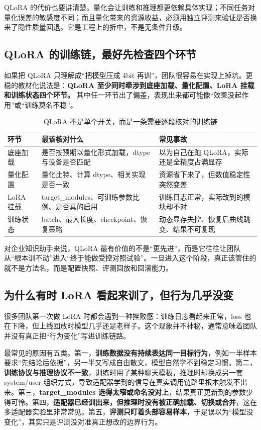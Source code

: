 QLoRA 的代价也要讲清楚。量化会让训练和推理都更依赖具体实现；不同任务对量化误差的敏感度不同；而且量化带来的资源收益，必须用独立评测来验证是否换来了隐性质量回退。它是工程上的折中，不是无条件升级。

\subsection{QLoRA 的训练链，最好先检查四个环节}
如果把 QLoRA 只理解成“把模型压成 4bit 再训”，团队很容易在实现上掉坑。更稳的教材化说法是：\textbf{QLoRA 至少同时牵涉到底座加载、量化配置、LoRA 挂载和训练状态四个环节。} 其中任一环节出了偏差，表现出来都可能像“效果没起作用”或“训练莫名不稳”。

\begin{table}[H]
\centering
\small
\begin{tabularx}{\textwidth}{>{\raggedright\arraybackslash}p{2.8cm}>{\raggedright\arraybackslash}p{3.2cm}>{\raggedright\arraybackslash}X}
\toprule
\textbf{环节} & \textbf{最该核对什么} & \textbf{常见事故} \\
\midrule
底座加载 & 是否按预期以量化形式加载，dtype 与设备是否匹配 & 以为自己在跑 QLoRA，实际还是全精度占满显存 \\
量化配置 & 量化比特、计算 dtype、相关实现是否一致 & 资源省下来了，但数值稳定性突然变差 \\
LoRA 挂载 & target\_modules、可训练参数比例、是否真的启用 & 训练日志正常，实际改到的模块却不对 \\
训练状态 & batch、最大长度、checkpoint、恢复策略 & 动态显存失控、恢复后曲线跳变、结果不可复现 \\
\bottomrule
\end{tabularx}
\caption{QLoRA 不是单个开关，而是一条需要逐段核对的训练链}
\label{tab:qlora-chain}
\end{table}

对企业知识助手来说，QLoRA 最有价值的不是“更先进”，而是它往往让团队从“根本训不动”进入“终于能做受控对照试验”。一旦进入这个阶段，真正该管住的就不是方法名，而是配置快照、评测回放和回滚能力。

\subsection{为什么有时 LoRA 看起来训了，但行为几乎没变}
很多团队第一次做 LoRA 时都会遇到一种挫败感：训练日志看起来正常，loss 也在下降，但上线回放时模型几乎还是老样子。这个现象并不神秘，通常意味着团队并没有真正把“行为变化”写进训练链路。

最常见的原因有五类。第一，\textbf{训练数据没有持续表达同一目标行为}，例如一半样本要求“先结论后依据”，另一半又写成自由散文，模型自然学不到稳定习惯。第二，\textbf{训练协议与推理协议不一致}，训练时用了某种聊天模板，推理时却换成另一套 system/user 组织方式，导致适配器学到的信号在真实调用链路里根本触发不出来。第三，\textbf{target\_modules 选得太窄或命名没对上}，结果真正更新到的参数少得可怜。第四，\textbf{适配器已经训出来，但推理时没有被正确加载、切换或合并}，这在多适配器实验里非常常见。第五，\textbf{评测只盯着头部容易样本}，于是误以为“模型没变化”，其实只是评测没对准真正想改的边界行为。

